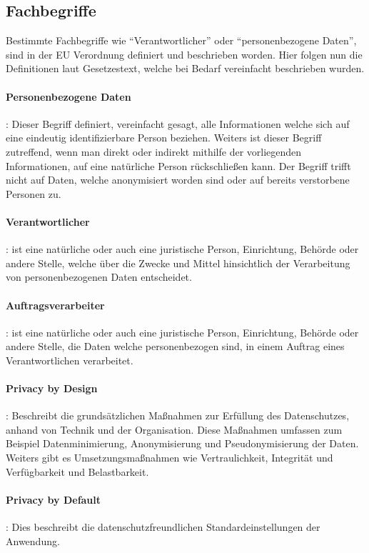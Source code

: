 \subsection{Fachbegriffe}
Bestimmte Fachbegriffe wie "`Verantwortlicher"' oder "`personenbezogene Daten"', sind in der EU Verordnung definiert und beschrieben worden. Hier folgen nun die Definitionen laut Gesetzestext, welche bei Bedarf vereinfacht beschrieben wurden. 

\paragraph{Personenbezogene Daten}: Dieser Begriff definiert, vereinfacht gesagt, alle Informationen welche sich auf eine eindeutig identifizierbare Person beziehen. Weiters ist dieser Begriff zutreffend, wenn man direkt oder indirekt mithilfe der vorliegenden Informationen, auf eine natürliche Person rückschließen kann.
Der Begriff trifft nicht auf Daten, welche anonymisiert worden sind oder auf bereits verstorbene Personen zu.

\paragraph{Verantwortlicher}: ist eine natürliche oder auch eine juristische Person, Einrichtung, Behörde oder andere Stelle, welche über die Zwecke und Mittel hinsichtlich der Verarbeitung von personenbezogenen Daten entscheidet.

\paragraph{Auftragsverarbeiter}: ist eine natürliche oder auch eine juristische Person, Einrichtung, Behörde oder andere Stelle, die Daten welche personenbezogen sind, in einem Auftrag eines Verantwortlichen verarbeitet.

\paragraph{Privacy by Design}: Beschreibt die grundsätzlichen Maßnahmen zur Erfüllung des Datenschutzes, anhand von Technik und der Organisation. Diese Maßnahmen umfassen zum Beispiel Datenminimierung, Anonymisierung und Pseudonymisierung der Daten. Weiters gibt es Umsetzungsmaßnahmen wie Vertraulichkeit, Integrität und Verfügbarkeit und Belastbarkeit.

\paragraph{Privacy by Default}: Dies beschreibt die datenschutzfreundlichen Standardeinstellungen der Anwendung.

